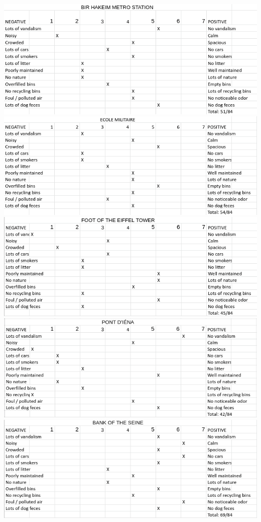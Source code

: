 \documentclass[11pt,letterpaper]{article}
\begin{document}
\includegraphics[width=0.5\linewidth]{media/bipolar/birhakeim.png}
\includegraphics[width=0.5\linewidth]{media/bipolar/ecolemilitaire.png}
\includegraphics[width=0.5\linewidth]{media/bipolar/eiffel.png}
\includegraphics[width=0.5\linewidth]{media/bipolar/iena.png}
\includegraphics[width=0.5\linewidth]{media/bipolar/seinebank.png}
\end{document}
